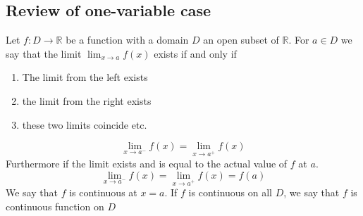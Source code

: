 \documentclass{report}
\theoremstyle{definition}
\theoremstyle{plain}
\theoremstyle{remark}
\begin{document}
\subsection{Review of one-variable case}
Let $ f: D \to \mathbb{R} $ be a function with a domain $ D $ an open subset of
$ \mathbb{R} $. For $ a \in D $ we say that the limit $ \displaystyle \lim_{x
\to a}  f(x) $ exists if and only if 
\begin{enumerate}
  \item The limit from the left exists
  \item the limit from the right exists
  \item these two limits coincide etc.
\end{enumerate}
    $$ \lim_{x \to a^-} f(x) = \lim_{x \to a^+}  f(x) $$
    Furthermore if the limit exists and is equal to the actual value of
    $ f $ at $ a $.
    $$ \lim_{x\to a^-}  f(x) = \lim_{x \to a^+}  f(x) = f(a) $$
    We say that $ f $ is continuous at $ x = a $. If $ f $ is continuous on all
    $ D $, we say that $ f $ is continuous function on $ D $
\end{document}
